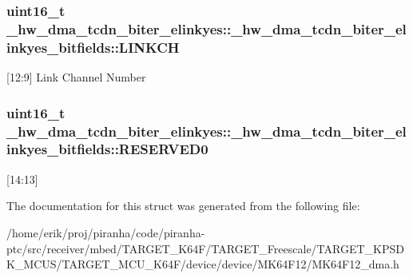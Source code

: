 \subsubsection[{\texorpdfstring{L\+I\+N\+K\+CH}{LINKCH}}]{\setlength{\rightskip}{0pt plus 5cm}uint16\+\_\+t \+\_\+hw\+\_\+dma\+\_\+tcdn\+\_\+biter\+\_\+elinkyes\+::\+\_\+hw\+\_\+dma\+\_\+tcdn\+\_\+biter\+\_\+elinkyes\+\_\+bitfields\+::\+L\+I\+N\+K\+CH}\hypertarget{struct__hw__dma__tcdn__biter__elinkyes_1_1__hw__dma__tcdn__biter__elinkyes__bitfields_a1466c73ea2b23709fd51ee74d9fbd5e5}{}\label{struct__hw__dma__tcdn__biter__elinkyes_1_1__hw__dma__tcdn__biter__elinkyes__bitfields_a1466c73ea2b23709fd51ee74d9fbd5e5}
\mbox{[}12\+:9\mbox{]} Link Channel Number 
\subsubsection[{\texorpdfstring{R\+E\+S\+E\+R\+V\+E\+D0}{RESERVED0}}]{\setlength{\rightskip}{0pt plus 5cm}uint16\+\_\+t \+\_\+hw\+\_\+dma\+\_\+tcdn\+\_\+biter\+\_\+elinkyes\+::\+\_\+hw\+\_\+dma\+\_\+tcdn\+\_\+biter\+\_\+elinkyes\+\_\+bitfields\+::\+R\+E\+S\+E\+R\+V\+E\+D0}\hypertarget{struct__hw__dma__tcdn__biter__elinkyes_1_1__hw__dma__tcdn__biter__elinkyes__bitfields_aaa52ced66b163d5d46b95bb9c5947359}{}\label{struct__hw__dma__tcdn__biter__elinkyes_1_1__hw__dma__tcdn__biter__elinkyes__bitfields_aaa52ced66b163d5d46b95bb9c5947359}
\mbox{[}14\+:13\mbox{]} 

The documentation for this struct was generated from the following file\+:\begin{DoxyCompactItemize}
\item 
/home/erik/proj/piranha/code/piranha-\/ptc/src/receiver/mbed/\+T\+A\+R\+G\+E\+T\+\_\+\+K64\+F/\+T\+A\+R\+G\+E\+T\+\_\+\+Freescale/\+T\+A\+R\+G\+E\+T\+\_\+\+K\+P\+S\+D\+K\+\_\+\+M\+C\+U\+S/\+T\+A\+R\+G\+E\+T\+\_\+\+M\+C\+U\+\_\+\+K64\+F/device/device/\+M\+K64\+F12/M\+K64\+F12\+\_\+dma.\+h\end{DoxyCompactItemize}
